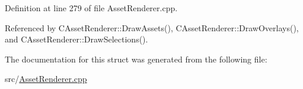 Definition at line 279 of file Asset\+Renderer.\+cpp.



Referenced by C\+Asset\+Renderer\+::\+Draw\+Assets(), C\+Asset\+Renderer\+::\+Draw\+Overlays(), and C\+Asset\+Renderer\+::\+Draw\+Selections().



The documentation for this struct was generated from the following file\+:\begin{DoxyCompactItemize}
\item 
src/\hyperlink{AssetRenderer_8cpp}{Asset\+Renderer.\+cpp}\end{DoxyCompactItemize}
